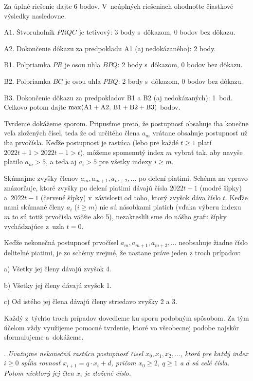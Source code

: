 {\schemaABC
Za úplné riešenie dajte 6 bodov.
V~neúplných riešeniach ohodnoťte čiastkové výsledky nasledovne.
\item{A1.} Štvoruholník $PRQC$ je tetivový: 3 body s~dôkazom, 0 bodov bez dôkazu.
\item{A2.} Dokončenie dôkazu za predpokladu A1 (aj nedokázaného): 2 body.
\item{B1.} Polpriamka $PR$ je osou uhla $BPQ$: 2 body s~dôkazom, 0 bodov bez dôkazu.
\item{B2.} Polpriamka $BC$ je osou uhla $PBQ$: 2 body s~dôkazom, 0 bodov bez dôkazu.
\item{B3.} Dokončenie dôkazu za predpokladov B1 a B2 (aj nedokázaných): 1~bod.
\endgraf\noindent
Celkovo potom dajte $\rm\max(A1+A2,\,B1+B2+B3)$ bodov.
\endschema
}

{%
Tvrdenie dokážeme sporom. Pripusťme preto, že postupnosť
obsahuje iba konečne veľa zložených čísel, teda že od určitého člena
$a_m$ vrátane obsahuje postupnosť už iba prvočísla.
Keďže postupnosť je rastúca (lebo pre každé $t\ge 1$ platí
$2022t+1>2022t-1>t$), môžeme spomenutý index $m$ vybrať tak, aby
navyše platilo $a_m>5$, a teda aj $a_i>5$ pre všetky indexy $i\ge m$.

Skúmajme zvyšky členov $a_m, a_{m+1},a_{m+2},\dots$ po delení
piatimi. Schéma na \obr{} vpravo znázorňuje, ktoré zvyšky po delení
piatimi dávajú čísla $2022t+1$ (modré šípky) a~$2022t-1$ (červené šípky)
v~závislosti od toho, ktorý zvyšok dáva číslo $t$. Keďže nami
skúmané členy $a_i$ ($i\ge m$) nie sú násobkami piatich
(vďaka výberu indexu $m$ to sú totiž prvočísla väčšie ako 5),
nezakreslili sme do nášho grafu šípky vychádzajúce z~uzla $t=0$.
%

Keďže nekonečná postupnosť prvočísel $a_m, a_{m+1},a_{m+2},\dots$
neobsahuje žiadne číslo deliteľné piatimi, je zo schémy zrejmé, že
nastane práve jeden z troch prípadov:

\item{a)} Všetky jej členy dávajú zvyšok 4.
\item{b)} Všetky jej členy dávajú zvyšok 1.
\item{c)} Od istého jej člena dávajú členy striedavo zvyšky 2 a 3.

\noindent
Každý z~týchto troch prípadov dovedieme ku sporu podobným spôsobom.
Za tým účelom vždy využijeme pomocné tvrdenie, ktoré vo všeobecnej podobe
najskôr sformulujeme a~dokážeme.

\smallskip{}.
{\sl
Uvažujme nekonečnú rastúcu postupnosť čísel
$x_0,x_1,x_2,\dots$, ktorá pre každý index $i\ge 0$
spĺňa rovnosť $x_{i+1}=q\cdot x_i+d$, pričom $x_0\ge2$, $q\ge 1$ a $d$
sú celé čísla. Potom niektorý jej člen $x_i$ je zložené číslo.
}

}
